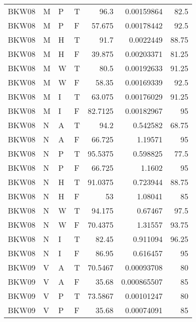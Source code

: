 \begin{longtable}{llllrrr}
    BKW08    & M     & P     & T          & 96.3       & 0.00159864  & 82.5     \\
    BKW08    & M     & P     & F          & 57.675     & 0.00178442  & 92.5     \\
    BKW08    & M     & H     & T          & 91.7       & 0.0022449   & 88.75    \\
    BKW08    & M     & H     & F          & 39.875     & 0.00203371  & 81.25    \\
    BKW08    & M     & W     & T          & 80.5       & 0.00192633  & 91.25    \\
    BKW08    & M     & W     & F          & 58.35      & 0.00169339  & 92.5     \\
    BKW08    & M     & I     & T          & 63.075     & 0.00176029  & 91.25    \\
    BKW08    & M     & I     & F          & 82.7125    & 0.00182967  & 95       \\
    BKW08    & N     & A     & T          & 94.2       & 0.542582    & 68.75    \\
    BKW08    & N     & A     & F          & 66.725     & 1.19571     & 95       \\
    BKW08    & N     & P     & T          & 95.5375    & 0.598825    & 77.5     \\
    BKW08    & N     & P     & F          & 66.725     & 1.1602      & 95       \\
    BKW08    & N     & H     & T          & 91.0375    & 0.723944    & 88.75    \\
    BKW08    & N     & H     & F          & 53         & 1.08041     & 85       \\
    BKW08    & N     & W     & T          & 94.175     & 0.67467     & 97.5     \\
    BKW08    & N     & W     & F          & 70.4375    & 1.31557     & 93.75    \\
    BKW08    & N     & I     & T          & 82.45      & 0.911094    & 96.25    \\
    BKW08    & N     & I     & F          & 86.95      & 0.616457    & 95       \\
    BKW09    & V     & A     & T          & 70.5467    & 0.00093708  & 80       \\
    BKW09    & V     & A     & F          & 35.68      & 0.000865507 & 85       \\
    BKW09    & V     & P     & T          & 73.5867    & 0.00101247  & 80       \\
    BKW09    & V     & P     & F          & 35.68      & 0.00074091  & 85       \\

\end{longtable}
